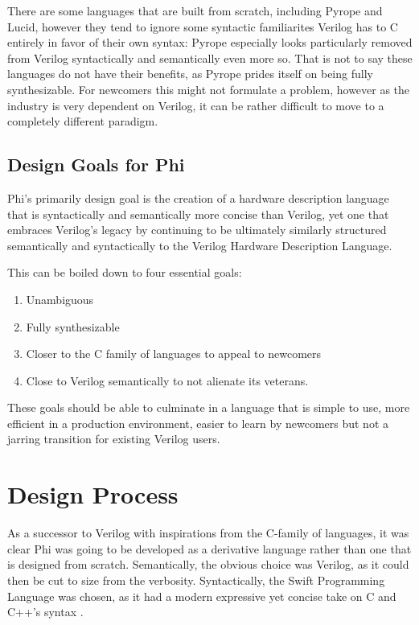 \documentclass[10pt, two column]{article}
\theoremstyle{definition}
\begin{document}
There are some languages that are built from scratch, including Pyrope and Lucid, however they tend to ignore some syntactic familiarites Verilog has to C entirely in favor of their own syntax: Pyrope especially looks particularly removed from Verilog syntactically and semantically even more so\cite{Pyrope}. That is not to say these languages do not have their benefits, as Pyrope prides itself on being fully synthesizable. For newcomers this might not formulate a problem, however as the industry is very dependent on Verilog, it can be rather difficult to move to a completely different paradigm.\newline

\subsection{Design Goals for Phi}
Phi’s primarily design goal is the creation of a hardware description language that is syntactically and semantically more concise than Verilog, yet one that embraces Verilog’s legacy by continuing to be ultimately similarly structured semantically and syntactically to the Verilog Hardware Description Language.\newline 

This can be boiled down to four essential goals:
\begin{enumerate}[label=\alph*)]
\item Unambiguous
\item Fully synthesizable
\item Closer to the C family of languages to appeal to newcomers
\item Close to Verilog semantically to not alienate its veterans.
\end{enumerate}

These goals should be able to culminate in a language that is simple to use, more efficient in a production environment, easier to learn by newcomers but not a jarring transition for existing Verilog users.

\section{Design Process}
As a successor to Verilog with inspirations from the C-family of languages, it was clear Phi was going to be developed as a derivative language rather than one that is designed from scratch. Semantically, the obvious choice was Verilog, as it could then be cut to size from the verbosity. Syntactically, the Swift Programming Language was chosen, as it had a modern expressive yet concise take on C and C++’s syntax \cite{swiftProgLang2019}.\newline
 
\end{document}
